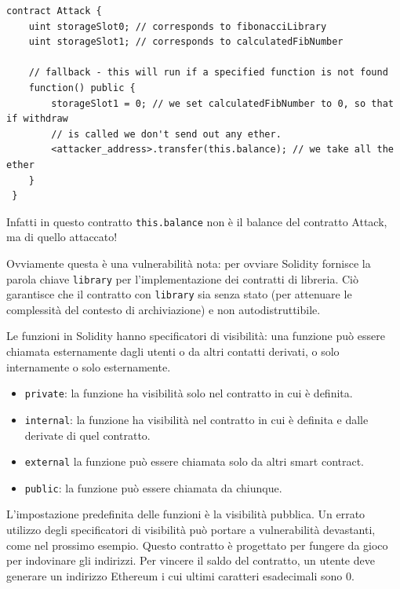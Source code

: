\begin{lstlisting}[language=Solidity]
contract Attack {
    uint storageSlot0; // corresponds to fibonacciLibrary
    uint storageSlot1; // corresponds to calculatedFibNumber
   
    // fallback - this will run if a specified function is not found
    function() public {
        storageSlot1 = 0; // we set calculatedFibNumber to 0, so that if withdraw
        // is called we don't send out any ether. 
        <attacker_address>.transfer(this.balance); // we take all the ether
    }
 }
\end{lstlisting}
Infatti in questo contratto \texttt{this.balance} non è il balance del contratto Attack, ma di quello attaccato!

Ovviamente questa è una vulnerabilità nota: per ovviare Solidity fornisce la parola chiave \texttt{library} per l'implementazione dei contratti di libreria. Ciò garantisce che il contratto con \texttt{library} sia senza stato (per attenuare le complessità del contesto di archiviazione) e non autodistruttibile.

\vspace{5mm}

Le funzioni in Solidity hanno specificatori di visibilità: una funzione può essere chiamata esternamente dagli utenti o da altri contatti derivati, o solo internamente o solo esternamente.

\begin{itemize}
    \item \texttt{private}: la funzione ha visibilità solo nel contratto in cui è definita.
    \item \texttt{internal}: la funzione ha visibilità nel contratto in cui è definita e dalle derivate di quel contratto.
    \item \texttt{external} la funzione può essere chiamata solo da altri smart contract.
    \item \texttt{public}: la funzione può essere chiamata da chiunque.
\end{itemize}
L'impostazione predefinita delle funzioni è la visibilità pubblica. Un errato utilizzo degli specificatori di visibilità può portare a vulnerabilità devastanti, come nel prossimo esempio. Questo contratto è progettato per fungere da gioco per indovinare gli indirizzi. Per vincere il saldo del contratto, un utente deve generare un indirizzo Ethereum i cui ultimi caratteri esadecimali sono 0.

